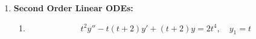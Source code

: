 \documentclass[letterpaper, fontsize=12pt]{scrartcl} %
\numberwithin{equation}{section} %
\numberwithin{figure}{section} %
\numberwithin{table}{section} %
\begin{document}
\begin{enumerate}


\item \textbf{Second Order Linear ODEs:}  \begin{enumerate}[label=(\alph*)]
\item \[ t^2y'' - t(t+2)y' +(t+2)y= 2t^4, \quad y_1 = t\]


\end{enumerate}
\end{enumerate}
\end{document}

